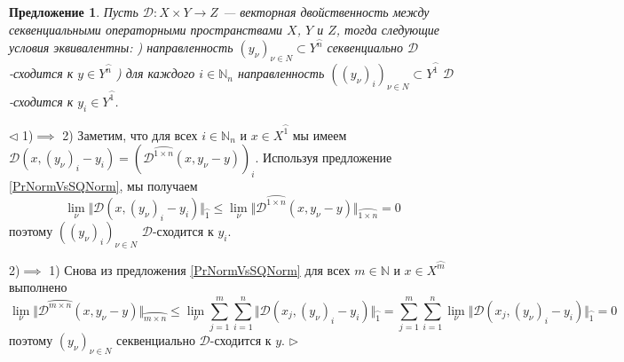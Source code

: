 \documentclass[12pt]{article}
\newtheorem{proposition}[theorem]{Предложение}
\newenvironment{proof}{\par $\triangleleft$}{$\triangleright$}
\begin{document}
\begin{proposition}\label{PrDConvEquivCoordwsConv} Пусть $\mathcal{D}:X\times Y\to Z$ --- векторная двойственность между секвенциальными операторными пространствами $X$, $Y$ и $Z$, тогда следующие условия эквивалентны:
) направленность $(y_\nu)_{\nu\in N}\subset Y^{\wideparen{n}}$ секвенциально $\mathcal{D}$-сходится к $y\in Y^{\wideparen{n}}$
) для каждого $i\in\mathbb{N}_n$ направленность $((y_\nu)_i)_{\nu\in N}\subset Y^{\wideparen{1}}$ $\mathcal{D}$-сходится к $y_i\in Y^{\wideparen{1}}$.
\end{proposition}
\begin{proof}
1)$\implies$ 2) Заметим, что для всех $i\in\mathbb{N}_n$ и $x\in X^{\wideparen{1}}$ мы имеем $\mathcal{D}(x,(y_\nu)_i-y_i)=(\mathcal{D}^{\wideparen{1\times n}}(x,y_\nu-y))_i$. Используя предложение \ref{PrNormVsSQNorm}, мы получаем
$$
\lim\limits_{\nu}\Vert \mathcal{D}(x,(y_\nu)_i-y_i)\Vert_{\wideparen{1}}
\leq\lim\limits_{\nu}\Vert \mathcal{D}^{\wideparen{1\times n}}(x,y_\nu-y)\Vert_{\wideparen{1\times n}}=0
$$
поэтому $((y_\nu)_i)_{\nu\in N}$ $\mathcal{D}$-сходится к $y_i$.

2)$\implies$ 1) Снова из предложения \ref{PrNormVsSQNorm} для всех $m\in\mathbb{N}$ и $x\in X^{\wideparen{m}}$ выполнено
$$
\lim\limits_{\nu}\Vert\mathcal{D}^{\wideparen{m\times n}}(x,y_\nu-y)\Vert_{\wideparen{m\times n}}
\leq\lim\limits_{\nu}\sum\limits_{j=1}^{m}\sum\limits_{i=1}^n\Vert\mathcal{D}(x_j,(y_\nu)_i-y_i)\Vert_{\wideparen{1}}
=\sum\limits_{j=1}^{m}\sum\limits_{i=1}^n\lim\limits_{\nu}\Vert\mathcal{D}(x_j,(y_\nu)_i-y_i)\Vert_{\wideparen{1}}=0
$$
поэтому $(y_\nu)_{\nu\in N}$ секвенциально $\mathcal{D}$-сходится к $y$.
\end{proof}
\end{document}

